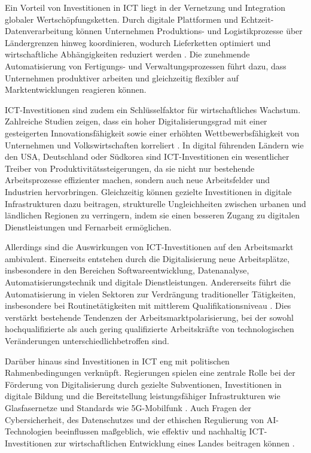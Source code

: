 Ein Vorteil von Investitionen in \ac{ICT} liegt in der Vernetzung und Integration globaler 
Wertschöpfungsketten. Durch digitale Plattformen und Echtzeit-Datenverarbeitung können 
Unternehmen Produktions- und Logistikprozesse über Ländergrenzen hinweg koordinieren, 
wodurch Lieferketten optimiert und wirtschaftliche Abhängigkeiten reduziert werden 
\parencite[S. 48]{oecd2019measuring}. Die zunehmende Automatisierung von Fertigungs- und 
Verwaltungsprozessen führt dazu, dass Unternehmen produktiver arbeiten und gleichzeitig 
flexibler auf Marktentwicklungen reagieren können.

\ac{ICT}-Investitionen sind zudem ein Schlüsselfaktor für wirtschaftliches Wachstum. 
Zahlreiche Studien zeigen, dass ein hoher Digitalisierungsgrad mit einer gesteigerten 
Innovationsfähigkeit sowie einer erhöhten Wettbewerbsfähigkeit von Unternehmen und 
Volkswirtschaften korreliert \parencite[S. 22]{brynjolfsson2015thesecond}. In digital 
führenden Ländern wie den USA, Deutschland oder Südkorea sind \ac{ICT}-Investitionen 
ein wesentlicher Treiber von Produktivitätssteigerungen, da sie nicht nur bestehende 
Arbeitsprozesse effizienter machen, sondern auch neue Arbeitsfelder und Industrien 
hervorbringen. Gleichzeitig können gezielte Investitionen in digitale Infrastrukturen 
dazu beitragen, strukturelle Ungleichheiten zwischen urbanen und ländlichen Regionen 
zu verringern, indem sie einen besseren Zugang zu digitalen Dienstleistungen und Fernarbeit 
ermöglichen.

Allerdings sind die Auswirkungen von \ac{ICT}-Investitionen auf den Arbeitsmarkt 
ambivalent. Einerseits entstehen durch die Digitalisierung neue Arbeitsplätze, 
insbesondere in den Bereichen Softwareentwicklung, Datenanalyse, Automatisierungstechnik 
und digitale Dienstleistungen. Andererseits führt die Automatisierung in vielen Sektoren 
zur Verdrängung traditioneller Tätigkeiten, insbesondere bei Routinetätigkeiten mit 
mittlerem Qualifikationsniveau \parencite[S. 40]{frey2013thefuture}. Dies verstärkt 
bestehende Tendenzen der Arbeitsmarktpolarisierung, bei der sowohl hochqualifizierte als 
auch gering qualifizierte Arbeitskräfte von technologischen Veränderungen 
unterschiedlichbetroffen sind.

Darüber hinaus sind Investitionen in \ac{ICT} eng mit politischen Rahmenbedingungen 
verknüpft. Regierungen spielen eine zentrale Rolle bei der Förderung von Digitalisierung 
durch gezielte Subventionen, Investitionen in digitale Bildung und die Bereitstellung 
leistungsfähiger Infrastrukturen wie Glasfasernetze und Standards wie 5G-Mobilfunk 
\parencite[S. 45]{oecd2020digital}. Auch Fragen der Cybersicherheit, des Datenschutzes und 
der ethischen Regulierung von \ac{AI}-Technologien beeinflussen maßgeblich, wie effektiv 
und nachhaltig \ac{ICT}-Investitionen zur wirtschaftlichen Entwicklung eines Landes 
beitragen können \parencite[S. 45]{oecd2020digital}. 

